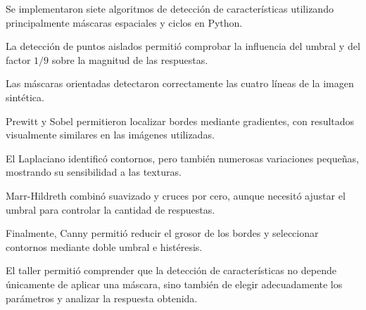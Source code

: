 \documentclass[11pt,letterpaper]{article}
\begin{document}
Se implementaron siete algoritmos
de detección de características
utilizando principalmente máscaras
espaciales y ciclos en Python.

La detección de puntos aislados
permitió comprobar la influencia
del umbral y del factor $1/9$
sobre la magnitud de las respuestas.

Las máscaras orientadas detectaron
correctamente las cuatro líneas
de la imagen sintética.

Prewitt y Sobel permitieron localizar
bordes mediante gradientes,
con resultados visualmente similares
en las imágenes utilizadas.

El Laplaciano identificó contornos,
pero también numerosas variaciones
pequeñas, mostrando su sensibilidad
a las texturas.

Marr-Hildreth combinó suavizado
y cruces por cero, aunque necesitó
ajustar el umbral para controlar
la cantidad de respuestas.

Finalmente, Canny permitió reducir
el grosor de los bordes y seleccionar
contornos mediante doble umbral
e histéresis.

El taller permitió comprender que
la detección de características
no depende únicamente de aplicar
una máscara, sino también de elegir
adecuadamente los parámetros
y analizar la respuesta obtenida.
\end{document}
